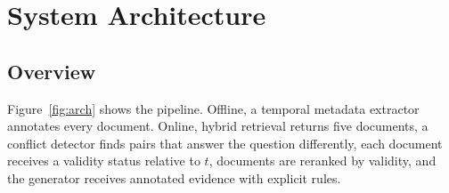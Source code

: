 \documentclass[11pt,a4paper]{report}
\begin{document}
\chapter{System Architecture}
\section{Overview}
Figure~\ref{fig:arch} shows the pipeline. Offline, a temporal metadata extractor annotates every document. Online, hybrid retrieval returns five documents, a conflict detector finds pairs that answer the question differently, each document receives a validity status relative to $t$, documents are reranked by validity, and the generator receives annotated evidence with explicit rules.
\end{document}
